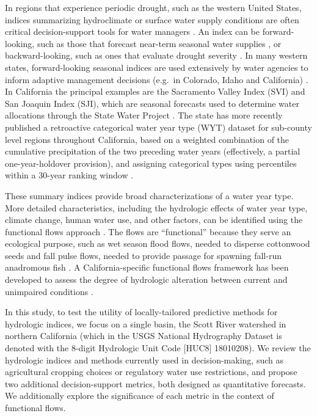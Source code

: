 \documentclass[hess, manuscript]{copernicus}
\begin{document}
In regions that experience periodic drought, such as the western United
States, indices summarizing hydroclimate or surface water supply
conditions are often critical decision-support tools for water managers
\citep[e.g.,][]{Garen1993}. An index can be forward-looking, such as
those that forecast near-term seasonal water supplies
\citep[e.g.,][]{Null2013, Verley2020}, or backward-looking, such as ones
that evaluate drought severity
\citep[e.g.,][]{Palmer1965, Guttman1998a, McKee1993, Wilhite1985, Wilhite2000}.
In many western states, forward-looking seasonal indices are used
extensively by water agencies to inform adaptive management decisions
(e.g.~in Colorado, Idaho and California)
\citetext{\citeyear[CDWR][]{ColoradoDWR2023}; \citeyear[NRCS][]{NRCS2023}; \citealp{Null2013}}.
In California the principal examples are the Sacramento Valley Index
(SVI) and San Joaquin Index (SJI), which are seasonal forecasts used to
determine water allocations through the State Water Project
\citetext{\citealp{Null2013}; \citeyear[DWR][]{DWR2022}}. The state has
more recently published a retroactive categorical water year type (WYT)
dataset for sub-county level regions throughout California, based on a
weighted combination of the cumulative precipitation of the two
preceding water years (effectively, a partial one-year-holdover
provision), and assigning categorical types using percentiles within a
30-year ranking window \citeyearpar[DWR][]{DWR2021a}.

These summary indices provide broad characterizations of a water year
type. More detailed characteristics, including the hydrologic effects of
water year type, climate change, human water use, and other factors, can
be identified using the functional flows approach
\citep[e.g.,][]{Poff1997, Bunn2002, Poff2010, Wheeler2018}. The flows
are ``functional'' because they serve an ecological purpose, such as wet
season flood flows, needed to disperse cottonwood seeds
\citep{Mahoney1998} and fall pulse flows, needed to provide passage for
spawning fall-run anadromous fish \citep{Moyle2002a}. A
California-specific functional flows framework has been developed to
assess the degree of hydrologic alteration between current and
unimpaired conditions \citep{Yarnell2020, Patterson2020}.

In this study, to test the utility of locally-tailored predictive
methods for hydrologic indices, we focus on a single basin, the Scott
River watershed in northern California (which in the USGS National
Hydrography Dataset is denoted with the 8-digit Hydrologic Unit Code
{[}HUC8{]} 18010208). We review the hydrologic indices and methods
currently used in decision-making, such as agricultural cropping choices
or regulatory water use restrictions, and propose two additional
decision-support metrics, both designed as quantitative forecasts. We
additionally explore the significance of each metric in the context of
functional flows.
\end{document}
